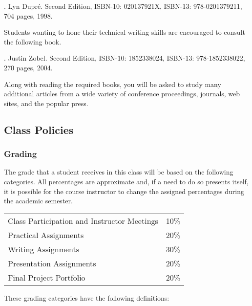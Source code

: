 . Lyn Dupr\'e. Second Edition, ISBN-10: 020137921X,
ISBN-13: 978-0201379211, 704 pages, 1998.

\noindent
Students wanting to hone their technical writing skills are encouraged to consult the following book.

. Justin Zobel. Second Edition, ISBN-10: 1852338024, ISBN-13:
978-1852338022, 270 pages, 2004.

\noindent Along with reading the required books, you will be asked to study many additional articles from a wide variety
of conference proceedings, journals, web sites, and the popular press.

\subsection*{Class Policies}

\subsubsection*{Grading}

The grade that a student receives in this class will be based on the following categories. All percentages are
approximate and, if a need to do so presents itself, it is possible for the course instructor to change the assigned
percentages during the academic semester.

\begin{center}
  \begin{tabular}{ll}

    Class Participation and Instructor Meetings & 10\% \\
    Practical Assignments                       & 20\% \\
    Writing Assignments                         & 30\% \\
    Presentation Assignments                    & 20\% \\
    Final Project Portfolio                     & 20\%

  \end{tabular}
\end{center}

\noindent
\vspace*{-.1in}
These grading categories have the following definitions:

